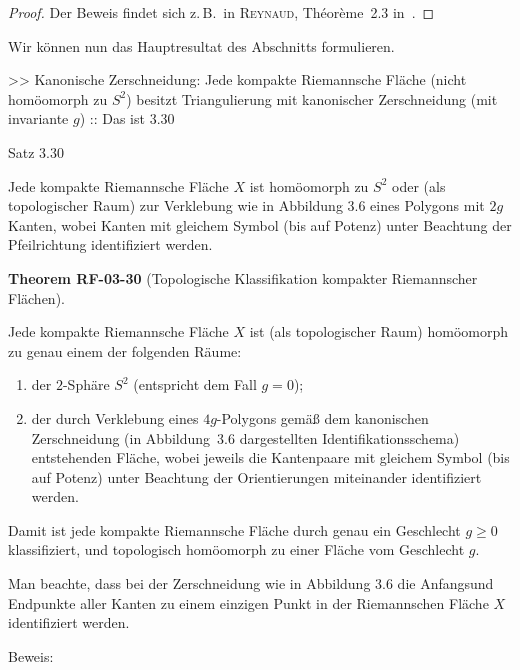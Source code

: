 \documentclass[10pt, letterpaper]{article}
\newcommand{\CustomHeading}[3]{%
  \par\medskip\noindent%
  \textbf{#1 #2} \textnormal{(#3)}.\enskip%
}
\newenvironment{THEO}[2]{\begin{unitbox}\CustomHeading{Theorem}{#1}{#2}}{\end{unitbox}}
\begin{document}
\begin{proof}
Der Beweis findet sich z.\,B.\ in \textsc{Reynaud}, Théorème~2.3 in~\cite{Rey89}.
\end{proof}

Wir können nun das Hauptresultat des Abschnitts formulieren.


>> Kanonische Zerschneidung: Jede kompakte Riemannsche Fläche (nicht homöomorph zu $S^2$) besitzt Triangulierung mit kanonischer Zerschneidung (mit invariante $g$) :: Das ist 3.30



Satz 3.30 

Jede kompakte Riemannsche Fläche $X$ ist homöomorph zu $S^{2}$ oder (als topologischer Raum) zur Verklebung wie in Abbildung 3.6 eines Polygons mit $2 g$ Kanten, wobei Kanten mit gleichem Symbol (bis auf Potenz) unter Beachtung der Pfeilrichtung identifiziert werden.

\begin{THEO}{RF-03-30}{Topologische Klassifikation kompakter Riemannscher Flächen}
Jede kompakte Riemannsche Fläche $X$ ist (als topologischer Raum) homöomorph zu genau einem der folgenden Räume:
\begin{enumerate}
  \item der $2$-Sphäre $S^{2}$ (entspricht dem Fall $g=0$);
  \item der durch Verklebung eines $4g$-Polygons gemäß dem kanonischen Zerschneidung (in Abbildung~3.6 dargestellten Identifikationsschema) entstehenden Fläche, wobei jeweils die Kantenpaare mit gleichem Symbol (bis auf Potenz) unter Beachtung der Orientierungen miteinander identifiziert werden.
\end{enumerate}
Damit ist jede kompakte Riemannsche Fläche durch genau ein Geschlecht $g\ge 0$
klassifiziert, und topologisch homöomorph zu einer Fläche vom Geschlecht $g$.

Man beachte, dass bei der Zerschneidung wie in Abbildung 3.6 die Anfangsund Endpunkte aller Kanten zu einem einzigen Punkt in der Riemannschen Fläche $X$ identifiziert werden.
\end{THEO}


Beweis: 
\end{document}
